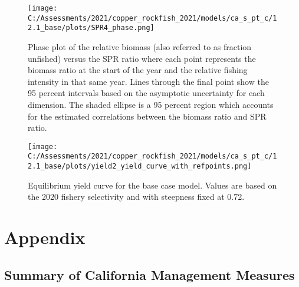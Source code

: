 \documentclass[11pt,
  english,
  a4paper,
]{article}
\begin{document}
\begin{figure}
\centering
\texttt{[image: C:/Assessments/2021/copper\_rockfish\_2021/models/ca\_s\_pt\_c/12.1\_base/plots/SPR4\_phase.png]}
\caption{Phase plot of the relative biomass (also referred to as fraction unfished) versus the SPR ratio where each point represents the biomass ratio at the start of the year and the relative fishing intensity in that same year. Lines through the final point show the 95 percent intervals based on the asymptotic uncertainty for each dimension. The shaded ellipse is a 95 percent region which accounts for the estimated correlations between the biomass ratio and SPR ratio.\label{fig:phase}}
\end{figure}

\tagmcend\tagstructend


\begin{figure}
\centering
\texttt{[image: C:/Assessments/2021/copper\_rockfish\_2021/models/ca\_s\_pt\_c/12.1\_base/plots/yield2\_yield\_curve\_with\_refpoints.png]}
\caption{Equilibrium yield curve for the base case model. Values are based on the 2020 fishery selectivity and with steepness fixed at 0.72.\label{fig:yield}}
\end{figure}

\tagmcend\tagstructend

\clearpage


\hypertarget{appendix}{%
\section{Appendix}\label{appendix}}

\leavevmode\tagmcend\tagstructend


\hypertarget{ca-man}{%
\subsection{Summary of California Management Measures}\label{ca-man}}

\leavevmode\tagmcend\tagstructend

\end{document}
